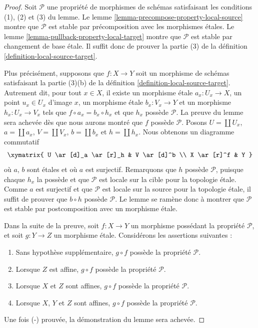 \begin{proof}
Soit $\mathcal{P}$ une propriété de morphismes de schémas satisfaisant les
conditions (1), (2) et (3) du lemme. Le
lemme \ref{lemma-precompose-property-local-source} montre que $\mathcal{P}$ est
stable par précomposition avec les morphismes étales. Le
lemme \ref{lemma-pullback-property-local-target} montre que $\mathcal{P}$ est
stable par changement de base \'etale. Il suffit donc de prouver la partie (3)
de la définition \ref{definition-local-source-target}.

\medskip\noindent
Plus précisément, supposons que $f : X \to Y$ soit un morphisme de schémas
satisfaisant la partie (3)(b) de la
définition \ref{definition-local-source-target}. Autrement dit, pour tout
$x \in X$, il existe un morphisme \'etale $a_x : U_x \to X$, un point
$u_x \in U_x$ d'image $x$, un morphisme \'etale $b_x : V_x \to Y$ et un
morphisme $h_x : U_x \to V_x$ tels que $f \circ a_x = b_x \circ h_x$ et que
$h_x$ possède $\mathcal{P}$. La preuve du lemme sera achevée dès que nous
aurons montré que $f$ possède $\mathcal{P}$. Posons $U = \coprod U_x$,
$a = \coprod a_x$, $V = \coprod V_x$, $b = \coprod b_x$ et
$h = \coprod h_x$. Nous obtenons un diagramme commutatif
$$
\xymatrix{
U \ar[d]_a \ar[r]_h & V \ar[d]^b \\
X \ar[r]^f & Y
}
$$
où $a$, $b$ sont étales et où $a$ est surjectif. Remarquons que $h$
possède $\mathcal{P}$, puisque chaque $h_x$ la possède et que $\mathcal{P}$ est
locale sur la cible pour la topologie \'etale. Comme $a$ est surjectif et que
$\mathcal{P}$ est locale sur la source pour la topologie \'etale, il suffit de
prouver que $b \circ h$ possède $\mathcal{P}$. Le lemme se ramène donc à
montrer que $\mathcal{P}$ est stable par postcomposition avec un morphisme
\'etale.

\medskip\noindent
Dans la suite de la preuve, soit $f : X \to Y$ un morphisme possédant la
propriété $\mathcal{P}$, et soit $g : Y \to Z$ un morphisme \'etale.
Considérons les assertions suivantes :
\begin{enumerate}
\item[(-)] Sans hypothèse supplémentaire, $g \circ f$ possède la propriété
$\mathcal{P}$.
\item[(A)] Lorsque $Z$ est affine, $g \circ f$ possède la propriété
$\mathcal{P}$.
\item[(AA)] Lorsque $X$ et $Z$ sont affines, $g \circ f$ possède la propriété
$\mathcal{P}$.
\item[(AAA)] Lorsque $X$, $Y$ et $Z$ sont affines, $g \circ f$ possède la
propriété $\mathcal{P}$.
\end{enumerate}
Une fois (-) prouvée, la démonstration du lemme sera achevée.


\end{proof}
